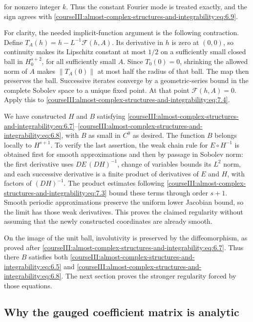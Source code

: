 for nonzero integer \(k\). Thus the constant Fourier mode is treated exactly, and the sign agrees with \eqref{courseIII:almost-complex-structures-and-integrability:eq:6.9}.

For clarity, the needed implicit-function argument is the following contraction. Define
\(T_A(h)=h-L^{-1}\mathcal F(h,A)\).
Its derivative in \(h\) is zero at \((0,0)\), so continuity makes its Lipschitz constant at most \(1/2\) on a sufficiently small closed ball in \(H^{s+2}_0\), for all sufficiently small \(A\). Since \(T_0(0)=0\), shrinking the allowed norm of \(A\) makes \(\|T_A(0)\|\) at most half the radius of that ball. The map then preserves the ball. Successive iterates converge by a geometric-series bound in the complete Sobolev space to a unique fixed point. At that point \(\mathcal F(h,A)=0\). Apply this to \eqref{courseIII:almost-complex-structures-and-integrability:eq:7.4}.

We have constructed \(H\) and \(B\) satisfying \eqref{courseIII:almost-complex-structures-and-integrability:eq:6.7}--\eqref{courseIII:almost-complex-structures-and-integrability:eq:6.8}, with \(B\) as small in \(C^0\) as desired. The function \(B\) belongs locally to \(H^{s+1}\). To verify the last assertion, the weak chain rule for \(E\circ H^{-1}\) is obtained first for smooth approximations and then by passage in Sobolev norm: the first derivative uses \(DE\,(DH)^{-1}\), change of variables bounds its \(L^2\) norm, and each successive derivative is a finite product of derivatives of \(E\) and \(H\), with factors of \((DH)^{-1}\). The product estimates following \eqref{courseIII:almost-complex-structures-and-integrability:eq:7.3} bound these terms through order \(s+1\). Smooth periodic approximations preserve the uniform lower Jacobian bound, so the limit has those weak derivatives. This proves the claimed regularity without assuming that the newly constructed coordinates are already smooth.

On the image of the unit ball, involutivity is preserved by the diffeomorphism, as proved after \eqref{courseIII:almost-complex-structures-and-integrability:eq:6.7}. Thus there \(B\) satisfies both \eqref{courseIII:almost-complex-structures-and-integrability:eq:6.5} and \eqref{courseIII:almost-complex-structures-and-integrability:eq:6.8}. The next section proves the stronger regularity forced by those equations.

\subsection{Why the gauged coefficient matrix is analytic}
\label{courseIII:almost-complex-structures-and-integrability:analytic-estimates}

